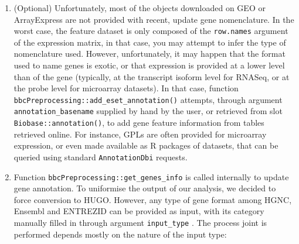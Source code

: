 \begin{enumerate}
\def\labelenumi{\arabic{enumi}.}
\setcounter{enumi}{-1}
\item
  (Optional) Unfortunately, most of the objects downloaded on GEO or ArrayExpress are not provided with recent, update gene nomenclature. In the worst case, the feature dataset is only composed of the \texttt{row.names} argument of the expression matrix, in that case, you may attempt to infer the type of nomenclature used. However, unfortunately, it may happen that the format used to name genes is exotic, or that expression is provided at a lower level than of the gene (typically, at the transcript isoform level for RNASeq, or at the probe level for microarray datasets). In that case, function \texttt{bbcPreprocessing::add\_eset\_annotation()} attempts, through argument \texttt{annotation\_basename} supplied by hand by the user, or retrieved from slot \texttt{Biobase::annotation()}, to add gene feature information from tables retrieved online. For instance, GPLs are often provided for microarray expression, or even made available as R packages of datasets, that can be queried using standard \texttt{AnnotationDbi} requests.
\item
  Function \texttt{bbcPreprocessing::get\_genes\_info} is called internally to update gene annotation. To uniformise the output of our analysis, we decided to force conversion to HUGO. However, any type of gene format among HGNC, Ensembl and ENTREZID can be provided as input, with its category manually filled in through argument \texttt{input\_type} . The process joint is performed depends mostly on the nature of the input type:

  \begin{itemize}
  

\end{itemize}
\end{enumerate}
